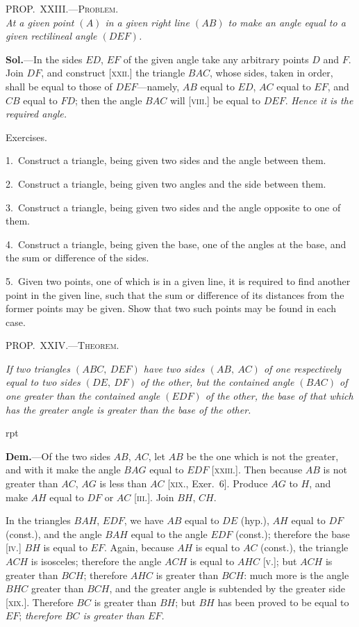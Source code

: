 \documentclass[oneside]{book}
\newcommand\myprop[2]{
\bigskip\Needspace*{4\baselineskip}\begin{center}\textsc{#1}\\\medskip\emph{#2}\par\end{center}
}
\newcommand\mypropl[2]{
\bigskip\Needspace*{4\baselineskip}\begin{center}\textsc{#1}\end{center}
\hspace{\parindent}\emph{#2}\par\medskip
}
\newcommand\exhead[1]{
\Needspace*{5\baselineskip}\begin{center}
\textsf{#1}
\end{center}
}
\newcommand\imgflow[3]{
\setcounter{wrapwidth}{#1}
\begin{wrapfigure}[#2]{r}{\value{wrapwidth}pt}
\begin{center}
\vspace{-0.3in}
\end{center}
\end{wrapfigure}
}
\newcommand\imgcent[2]{
\begin{center}
\end{center}
}
\begin{document}
\myprop{PROP\@.~XXIII\@.---Problem.}{At a given point $(A)$ in a given right line $(AB)$ to make
an angle equal to a given rectilineal angle $(DEF)$.}

\imgcent{270}{f040}

\textbf{Sol.}---In the sides $ED$, $EF$ of the given angle take
any arbitrary points $D$ and $F$. Join $DF$, and construct
[\textsc{xxii}.] the triangle $BAC$, whose sides, taken in order,
shall be equal to those of $DEF$---namely, $AB$ equal to
$ED$, $AC$ equal to $EF$, and $CB$ equal to $FD$; then the
angle $BAC$ will [\textsc{viii}.] be equal to $DEF$. \textit{Hence it is
the required angle.}


\exhead{Exercises.}

\begin{footnotesize}
1.~Construct a triangle, being given two sides and the angle
between them.

2.~Construct a triangle, being given two angles and the side
between them.

3.~Construct a triangle, being given two sides and the angle
opposite to one of them.

4.~Construct a triangle, being given the base, one of the angles
at the base, and the sum or difference of the sides.

5.~Given two points, one of which is in a given line, it is required
to find another point in the given line, such that the sum
or difference of its distances from the former points may be given.
Show that two such points may be found in each case.
\par\end{footnotesize}


\mypropl{PROP\@.~XXIV\@.---Theorem.}{If two triangles $(ABC,\ DEF)$ have two sides $(AB,\ AC)$
of one respectively equal to two sides $(DE,\ DF)$ of the
other, but the contained angle $(BAC)$ of one greater than
the contained angle $(EDF)$ of the other, the base of that
which has the greater angle is greater than the base of the
other.}

\imgflow{180}{12}{f041}

\textbf{Dem.}---Of the two sides $AB$, $AC$, let $AB$ be the one
which is not the greater, and with it make the angle
$BAG$ equal to $EDF$ [\textsc{xxiii}.]. Then because $AB$ is not
greater than $AC$, $AG$ is less than $AC$ [\textsc{xix}., Exer.~6].
Produce $AG$ to $H$, and make $AH$ equal to $DF$ or $AC$
[\textsc{iii.}]. Join $BH$, $CH$.

In the triangles
$BAH$, $EDF$, we have
$AB$ equal to $DE$
(hyp.), $AH$ equal to
$DF$ (const.), and the
angle $BAH$ equal
to the angle $EDF$
(const.); therefore the
base [\textsc{iv.}] $BH$ is equal
to $EF$. Again, because
$AH$ is equal to $AC$ (const.), the triangle $ACH$ is isosceles;
therefore the angle $ACH$ is equal to $AHC$ [\textsc{v.}];
but $ACH$ is greater than $BCH$; therefore $AHC$ is
greater than $BCH$: much more is the angle $BHC$
greater than $BCH$, and the greater angle is subtended
by the greater side [\textsc{xix.}]. Therefore $BC$ is greater
than $BH$; but $BH$ has been proved to be equal to $EF$;
\textit{therefore $BC$ is greater than $EF$.}\par\medskip
\end{document}
